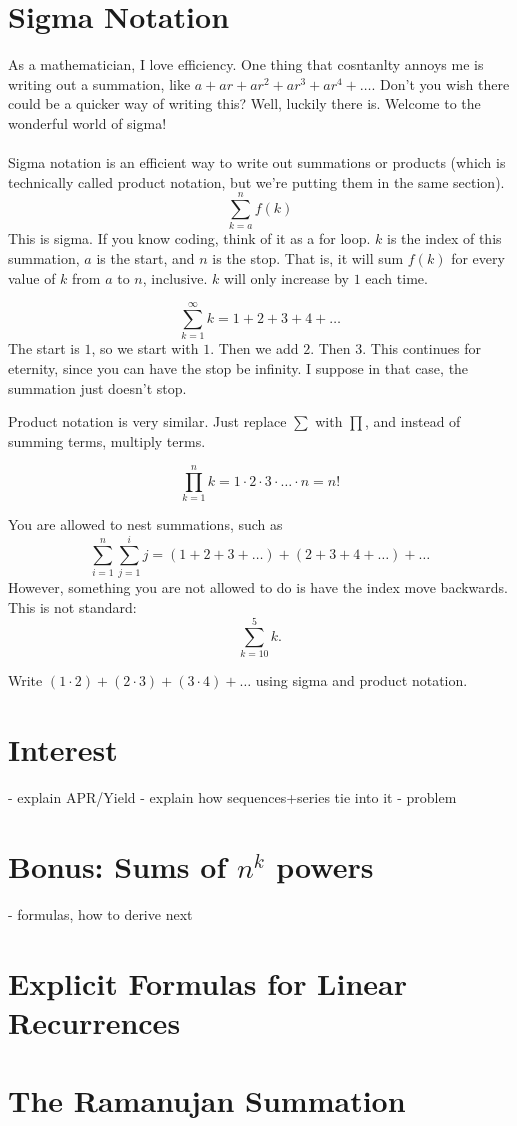 \section{Sigma Notation}
As a mathematician, I love efficiency. One thing that cosntanlty annoys me is writing out a summation, like $a+ar+ar^2+ar^3+ar^4+\dots$. Don't you wish there could be a quicker way of writing this? Well, luckily there is. Welcome to the wonderful world of sigma!\\\\
Sigma notation is an efficient way to write out summations or products (which is technically called product notation, but we're putting them in the same section).
\[\sum_{k=a}^{n}f(k)\]
This is sigma. If you know coding, think of it as a for loop. $k$ is the index of this summation, $a$ is the start, and $n$ is the stop. That is, it will sum $f(k)$ for every value of $k$ from $a$ to $n$, inclusive. $k$ will only increase by $1$ each time. 
\begin{example}
    \[\sum_{k=1}^{\infty}k=1+2+3+4+\dots\]
    The start is $1$, so we start with $1$. Then we add $2$. Then $3$. This continues for eternity, since you can have the stop be infinity. I suppose in that case, the summation just doesn't stop. 
\end{example}
Product notation is very similar. Just replace $\sum$ with $\prod$, and instead of summing terms, multiply terms.
\begin{example}[n!]
    \[\prod_{k=1}^{n}k=1\cdot 2\cdot 3\cdot \dots \cdot n=n!\]
\end{example}
You are allowed to nest summations, such as 
\[\sum_{i=1}^{n}\sum_{j=1}^{i}j=(1+2+3+\dots)+(2+3+4+\dots)+\dots\]
However, something you are not allowed to do is have the index move backwards. This is not standard:
\[\sum_{k=10}^{5}k.\]
\begin{problem}
    Write $(1\cdot2)+(2\cdot 3)+(3\cdot 4)+\dots$ using sigma and product notation.
\end{problem}
\section{Interest}
- explain APR/Yield
- explain how sequences+series tie into it
- problem 

\begin{subappendices}
\section{Bonus: Sums of $n^k$ powers}
    - formulas, how to derive next
\section{Explicit Formulas for Linear Recurrences}
\section{The Ramanujan Summation}
\end{subappendices}